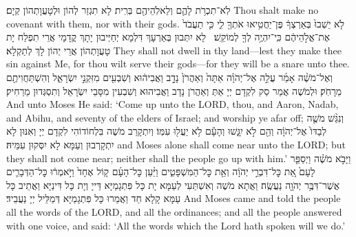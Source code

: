 {%
{לֹֽא־תִכְרֹ֥ת לָהֶ֛ם וְלֵאלֹֽהֵיהֶ֖ם בְּרִֽית׃}
{לָא תִגְזַר לְהוֹן וּלְטָעֲוָתְהוֹן קְיָם׃}
{Thou shalt make no covenant with them, nor with their gods.}{}
{לֹ֤א יֵשְׁבוּ֙ בְּאַרְצְךָ֔ פֶּן־יַחֲטִ֥יאוּ אֹתְךָ֖ לִ֑י כִּ֤י תַעֲבֹד֙ אֶת־אֱלֹ֣הֵיהֶ֔ם כִּֽי־יִהְיֶ֥ה לְךָ֖ לְמוֹקֵֽשׁ׃ \petucha 
{}}
{לָא יִתְּבוּן בְּאַרְעָךְ דִּלְמָא יְחַיְּיבוּן יָתָךְ קֳדָמָי אֲרֵי תִפְלַח יָת טָעֲוָתְהוֹן אֲרֵי יְהוֹן לָךְ לְתַקְלָא׃}
{They shall not dwell in thy land—lest they make thee sin against Me, for thou wilt serve their gods—for they will be a snare unto thee.}{}
\newperek
{}%
{וְאֶל־מֹשֶׁ֨ה אָמַ֜ר עֲלֵ֣ה אֶל־יְהֹוָ֗ה אַתָּה֙ וְאַהֲרֹן֙ נָדָ֣ב וַאֲבִיה֔וּא וְשִׁבְעִ֖ים מִזִּקְנֵ֣י יִשְׂרָאֵ֑ל וְהִשְׁתַּחֲוִיתֶ֖ם מֵרָחֹֽק׃
}
{וּלְמֹשֶׁה אֲמַר סַק לִקְדָם יְיָ אַתְּ וְאַהֲרֹן נָדָב וַאֲבִיהוּא וְשִׁבְעִין מִסָּבֵי יִשְׂרָאֵל וְתִסְגְּדוּן מֵרַחִיק׃}
{And unto Moses He said: ‘Come up unto the LORD, thou, and Aaron, Nadab, and Abihu, and seventy of the elders of Israel; and worship ye afar off;}{}
{וְנִגַּ֨שׁ מֹשֶׁ֤ה לְבַדּוֹ֙ אֶל־יְהֹוָ֔ה וְהֵ֖ם לֹ֣א יִגָּ֑שׁוּ וְהָעָ֕ם לֹ֥א יַעֲל֖וּ עִמּֽוֹ׃
}
{וְיִתְקָרַב מֹשֶׁה בִּלְחוֹדוֹהִי לִקְדָם יְיָ וְאִנּוּן לָא יִתְקָרְבוּן וְעַמָּא לָא יִסְּקוּן עִמֵּיהּ׃}
{and Moses alone shall come near unto the LORD; but they shall not come near; neither shall the people go up with him.’}{}
{וַיָּבֹ֣א מֹשֶׁ֗ה וַיְסַפֵּ֤ר לָעָם֙ אֵ֚ת כׇּל־דִּבְרֵ֣י יְהֹוָ֔ה וְאֵ֖ת כׇּל־הַמִּשְׁפָּטִ֑ים וַיַּ֨עַן כׇּל־הָעָ֜ם ק֤וֹל אֶחָד֙ וַיֹּ֣אמְר֔וּ כׇּל־הַדְּבָרִ֛ים אֲשֶׁר־דִּבֶּ֥ר יְהֹוָ֖ה נַעֲשֶֽׂה׃
}
{וַאֲתָא מֹשֶׁה וְאִשְׁתַּעִי לְעַמָּא יָת כָּל פִּתְגָמַיָּא דַּייָ וְיָת כָּל דִּינַיָּא וַאֲתֵיב כָּל עַמָּא קָלָא חַד וַאֲמַרוּ כָּל פִּתְגָמַיָּא דְּמַלֵּיל יְיָ נַעֲבֵיד׃}
{And Moses came and told the people all the words of the LORD, and all the ordinances; and all the people answered with one voice, and said: ‘All the words which the Lord hath spoken will we do.’}{}
}
